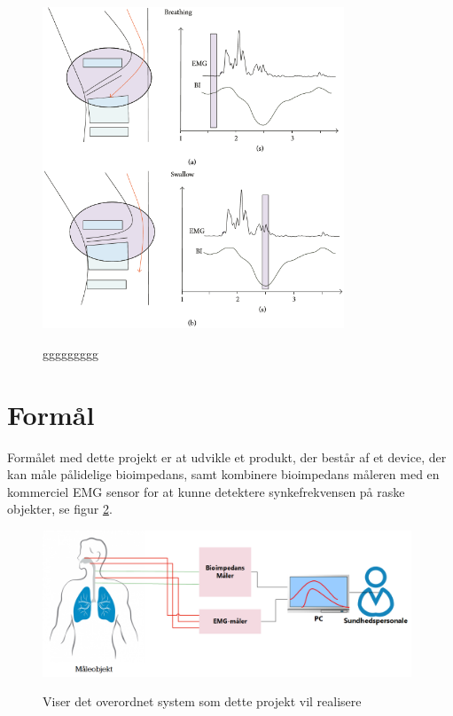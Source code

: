 \begin{figure}[H]
\centering
{\includegraphics[width=9cm]
{Figure/EMGBIGraph}}
\caption{ggggggggg\cite{Bass1992Dysphagia:Management}}
\label{EMGBIGraph}
\end{figure}

\section{Formål}

Formålet med dette projekt er at udvikle et produkt, der består af et device, der kan måle pålidelige bioimpedans, samt kombinere bioimpedans måleren med en kommerciel EMG sensor for at kunne detektere synkefrekvensen på raske objekter, se figur \ref{KonceptuelDiagram}.


\begin{figure}[H]
\centering
{\includegraphics[width=11cm]
{Figure/KonceptuelDiagram}}
\caption{Viser det overordnet system som dette projekt vil realisere}
\label{KonceptuelDiagram}
\end{figure}

